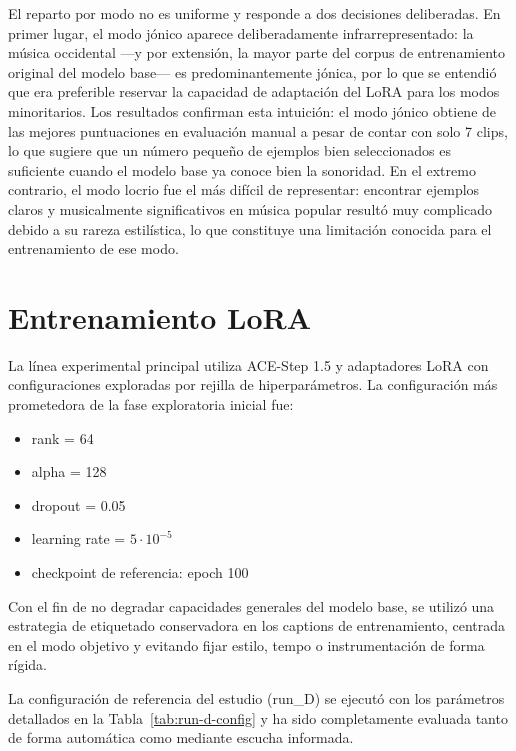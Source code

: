 \documentclass[%
    school=etsisi,%
    type=pfg,%
    degree=61CD,%
]{upm-report}
\begin{document}
El reparto por modo no es uniforme y responde a dos decisiones deliberadas. En primer lugar, el modo j\'onico aparece deliberadamente infrarrepresentado: la m\'usica occidental ---y por extensi\'on, la mayor parte del corpus de entrenamiento original del modelo base--- es predominantemente j\'onica, por lo que se entendi\'o que era preferible reservar la capacidad de adaptaci\'on del LoRA para los modos minoritarios. Los resultados confirman esta intuici\'on: el modo j\'onico obtiene de las mejores puntuaciones en evaluaci\'on manual a pesar de contar con solo 7 clips, lo que sugiere que un n\'umero peque\~no de ejemplos bien seleccionados es suficiente cuando el modelo base ya conoce bien la sonoridad. En el extremo contrario, el modo locrio fue el m\'as dif\'icil de representar: encontrar ejemplos claros y musicalmente significativos en m\'usica popular result\'o muy complicado debido a su rareza estil\'istica, lo que constituye una limitaci\'on conocida para el entrenamiento de ese modo.

\section{Entrenamiento LoRA}

La l\'inea experimental principal utiliza ACE-Step 1.5 y adaptadores LoRA con configuraciones exploradas por rejilla de hiperpar\'ametros. La configuraci\'on m\'as prometedora de la fase exploratoria inicial fue:

\begin{itemize}
    \item rank = 64
    \item alpha = 128
    \item dropout = 0.05
    \item learning rate = $5 \cdot 10^{-5}$
    \item checkpoint de referencia: epoch 100
\end{itemize}

Con el fin de no degradar capacidades generales del modelo base, se utiliz\'o una estrategia de etiquetado conservadora en los captions de entrenamiento, centrada en el modo objetivo y evitando fijar estilo, tempo o instrumentaci\'on de forma r\'igida.

La configuraci\'on de referencia del estudio (run\_D) se ejecut\'o con los par\'ametros detallados en la Tabla~\ref{tab:run-d-config} y ha sido completamente evaluada tanto de forma autom\'atica como mediante escucha informada.
\end{document}
